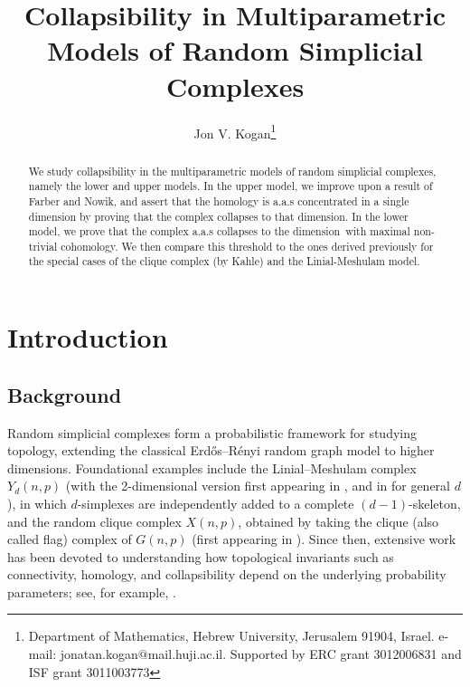 \documentclass{article}
\title{Collapsibility in Multiparametric Models of Random Simplicial Complexes}
\author{Jon V. Kogan\footnote{Department of Mathematics, Hebrew University, Jerusalem 91904, Israel. e-mail:
jonatan.kogan$@$mail.huji.ac.il. Supported by ERC grant 3012006831 and ISF grant 3011003773}}
\date{\vspace{-5ex}}
\theoremstyle{plain}
\theoremstyle{definition}
\theoremstyle{remark}
\newcommand{\di}{dimension}
\begin{document}
\maketitle


\begin{abstract}
We study collapsibility in the multiparametric models of random simplicial complexes, namely the lower and upper models.
In the upper model, we improve upon a result of Farber and Nowik, and assert that the homology  is a.a.s concentrated in a single dimension by proving that the complex collapses to that \di.
In the lower model, we prove that the complex a.a.s collapses to the \di\ with maximal non-trivial cohomology. We then compare this threshold to the ones derived previously for the special cases of the clique complex (by Kahle) and the Linial-Meshulam model.

\end{abstract}

\section{Introduction}
\subsection{Background}
Random simplicial complexes form a probabilistic framework for studying topology, extending the classical Erd\H{o}s--R\'enyi random graph model to higher dimensions. 
Foundational examples include the Linial--Meshulam complex $Y_d(n,p)$ (with the 2-\di al version first appearing in \cite{LinialMeshulam}, and in \cite{MeshulamWallach} for general $d$), in which $d$-simplexes are independently added to a complete $(d-1)$-skeleton, and the random clique complex $X(n,p)$, obtained by taking the clique (also called flag) complex of $G(n,p)$ (first appearing in \cite{KAHLE09}). 
Since then, extensive work has been devoted to understanding how topological invariants such as connectivity, homology, and collapsibility depend on the underlying probability parameters; see, for example, \cite{MeshulamWallach,LinialPeled16,AronshtamLinialLM13,MALEN23}. 
\end{document}

